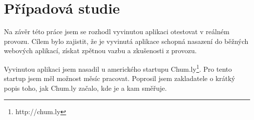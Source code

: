 \documentclass[bc,male,java,dept456]{diploma}						%
\begin{document}

\section{Případová studie}

Na závěr této práce jsem se rozhodl vyvinutou aplikaci otestovat v reálném provozu. Cílem bylo zajistit, že je vyvinutá aplikace schopná nasazení do běžných webových aplikací, získat zpětnou vazbu a zkušenosti z provozu. 

Vyvinutou aplikaci jsem nasadil u amerického startupu Chum.ly\footnote{http://chum.ly}. Pro tento startup jsem měl možnost měsíc pracovat. Poprosil jsem zakladatele o krátký popis toho, jak Chum.ly začalo, kde je a kam směřuje.
\end{document}
